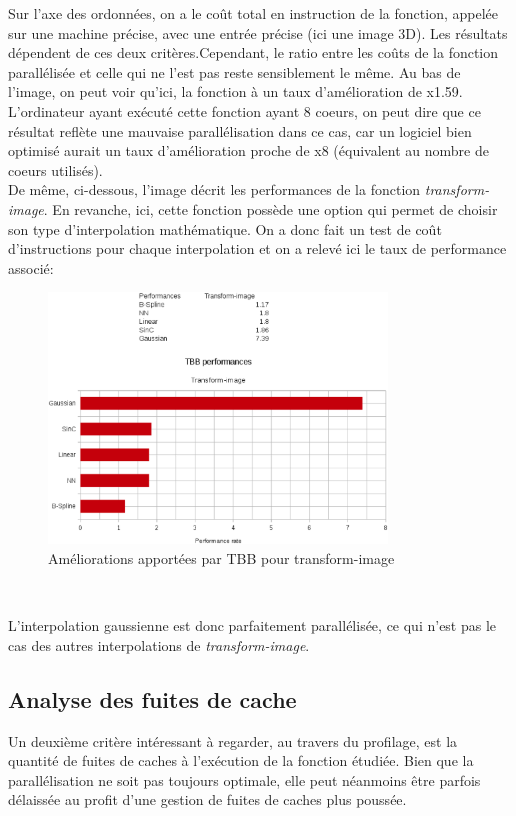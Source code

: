 \documentclass[10pt]{report}
\begin{document}
	Sur l'axe des ordonnées, on a le coût total en instruction de la fonction, appelée sur une machine précise, avec une entrée précise (ici une image 3D). Les résultats dépendent de ces deux critères.Cependant, le ratio entre les coûts de la fonction parallélisée et celle qui ne l'est pas reste sensiblement le même. Au bas de l'image, on peut voir qu'ici, la fonction à un taux d'amélioration de x1.59. L'ordinateur ayant exécuté cette fonction ayant 8 coeurs, on peut dire que ce résultat reflète une mauvaise parallélisation dans ce cas, car un logiciel bien optimisé aurait un taux d'amélioration proche de x8 (équivalent au nombre de coeurs utilisés).\\
	De même, ci-dessous, l'image décrit les performances de la fonction \textit{transform-image}. En revanche, ici, cette fonction possède une option qui permet de choisir son type d'interpolation mathématique. On a donc fait un test de coût d'instructions pour chaque interpolation et on a relevé ici le taux de performance associé:
	\begin{figure}[h!]
		\begin{center}
			\includegraphics[width=9cm]{Reports/figures/performances_tbb_transform_image.eps}
		\end{center}	
		\caption{Améliorations apportées par TBB pour transform-image}
		\label{Améliorations apportées par TBB pour transform-image}
	\end{figure}~\par
	L'interpolation gaussienne est donc parfaitement parallélisée, ce qui n'est pas le cas des autres interpolations de \textit{transform-image}.
	\subsection{Analyse des fuites de cache}
	Un deuxième critère intéressant à regarder, au travers du profilage, est la quantité de fuites de caches à l'exécution de la fonction étudiée. Bien que la parallélisation ne soit pas toujours optimale, elle peut néanmoins être parfois délaissée au profit d'une gestion de fuites de caches plus poussée.
\end{document}

